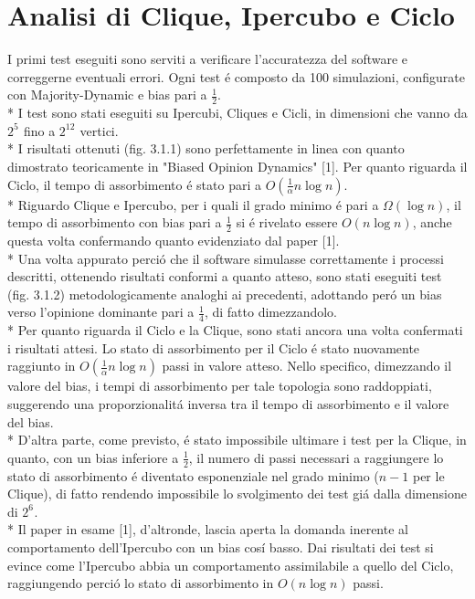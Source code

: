 \documentclass[../Tesi.tex]{subfiles}
\begin{document}
\section{Analisi di Clique, Ipercubo e Ciclo}
I primi test eseguiti sono serviti a verificare l'accuratezza del software e correggerne eventuali errori. Ogni test \'e composto da 100 simulazioni, configurate con Majority-Dynamic e bias pari a $\frac{1}{2}$.\\*
I test sono stati eseguiti su Ipercubi, Cliques e Cicli, in dimensioni che vanno da $2^{5^{\mathrm{}}}$ fino a $2^{12^{\mathrm{}}}$ vertici.\\*
I risultati ottenuti (fig. 3.1.1) sono perfettamente in linea con quanto dimostrato teoricamente in  "Biased Opinion Dynamics" [1]. Per quanto riguarda il Ciclo, il tempo di assorbimento \'e stato pari a $O(\frac{1}{\alpha}n\log{}n)$. \\*
Riguardo Clique e Ipercubo, per i quali il grado minimo \'e pari a $\Omega(\log{}n)$, il tempo di assorbimento con bias pari a $\frac{1}{2}$ si \'e rivelato essere $O(n\log{}n)$, anche questa volta confermando quanto evidenziato dal paper [1].\\*
Una volta appurato perci\'o che il software simulasse correttamente i processi descritti, ottenendo risultati conformi a quanto atteso, sono stati eseguiti test (fig. 3.1.2) metodologicamente analoghi ai precedenti, adottando per\'o un bias verso l'opinione dominante pari a $\frac{1}{4}$, di fatto dimezzandolo.\\*
Per quanto riguarda il Ciclo e la Clique, sono stati ancora una volta confermati i risultati attesi.
Lo stato di assorbimento per il Ciclo \'e stato nuovamente raggiunto in $O(\frac{1}{\alpha}n\log{}n)$ passi in valore atteso. Nello specifico, dimezzando il valore del bias, i tempi di assorbimento per tale topologia sono raddoppiati, suggerendo una proporzionalit\'a inversa tra il tempo di assorbimento e il valore del bias.\\*
D'altra parte, come previsto, \'e stato impossibile ultimare i test per la Clique, in quanto, con un bias inferiore a $\frac{1}{2}$, il numero di passi necessari a raggiungere lo stato di assorbimento \'e diventato esponenziale nel grado minimo ($n-1$ per le Clique), di fatto rendendo impossibile lo svolgimento dei test gi\'a dalla dimensione di $2^{6^{\mathrm{}}}$.\\*
Il paper in esame [1], d'altronde, lascia aperta la domanda inerente al comportamento dell'Ipercubo con un bias cos\'i basso. Dai risultati dei test si evince come l'Ipercubo abbia un comportamento assimilabile a quello del Ciclo, raggiungendo perci\'o lo stato di assorbimento in $O(n\log{}n)$ passi.
\end{document}
